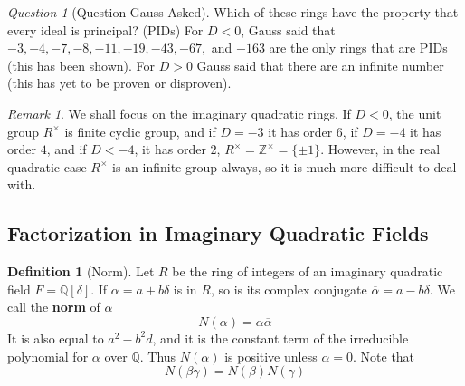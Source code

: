 \documentclass[12pt]{article}
\theoremstyle{definition}
\newtheorem{defn}[thm]{Definition}
\theoremstyle{remark}
\newtheorem{rmk}[thm]{Remark}
\newtheorem*{qst}{Question}
\numberwithin{equation}{section}
\newcommand\Z{\mathbb Z}    %
\newcommand\Q{\mathbb Q}    %
\newcommand\B[1]{\textbf{ #1}}
\begin{document}
\vspace{15pt}

\begin{qst}[Question Gauss Asked]
        Which of these rings have the property that every ideal is principal? (PIDs) For $D < 0$, Gauss said that $-3,-4,-7,-8,-11,-19,-43,-67,$ and $-163$ are the only rings that are PIDs (this has been shown). For $D > 0$ Gauss said that there are an infinite number (this has yet to be proven or disproven).
\end{qst}

\vspace{15pt}

\begin{rmk}
        We shall focus on the imaginary quadratic rings. If $D < 0$, the unit group $R^{\times}$ is finite cyclic group, and if $D = -3$ it has order 6, if $D = -4$ it has order $4$, and if $D < -4$, it has order 2, $R^{\times} = \Z^{\times} = \{\pm 1\}$. However, in the real quadratic case $R^{\times}$ is an infinite group always, so it is much more difficult to deal with. 
\end{rmk}

\vspace{15pt}





\subsection{Factorization in Imaginary Quadratic Fields}

\begin{defn}[Norm]
        Let $R$ be the ring of integers of an imaginary quadratic field $F =\Q[\delta]$. If $\alpha = a+b\delta$ is in $R$, so is its complex conjugate $\overline{\alpha} = a-b\delta$. We call the \B{norm} of $\alpha$ \begin{equation}
                N(\alpha) = \alpha\overline{\alpha}
        \end{equation}
        It is also equal to $a^2-b^2d$, and it is the constant term of the irreducible polynomial for $\alpha$ over $\Q$. Thus $N(\alpha)$ is positive unless $\alpha = 0$. Note that \begin{equation}
                N(\beta\gamma) = N(\beta)N(\gamma)
        \end{equation}
\end{defn}

\vspace{15pt}
\end{document}
